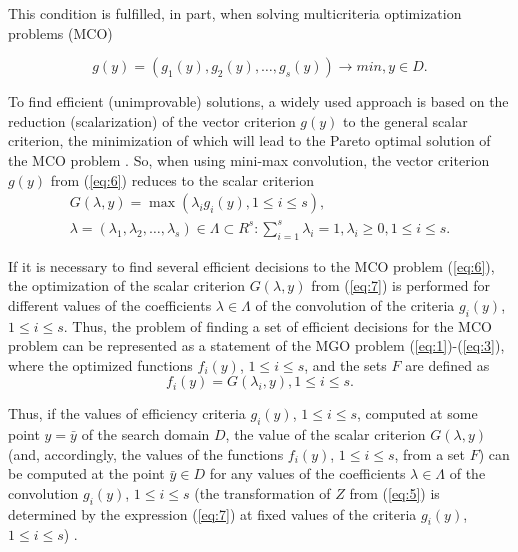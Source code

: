 \documentclass[review]{elsarticle}
\begin{document}
This condition is fulfilled, in part, when solving multicriteria optimization problems (MCO)

\begin{equation}\label{eq:6}
g(y) = (g_1(y), g_2(y), \dots , g_s(y)) \to min,  y\in D.
\end{equation}

To find efficient (unimprovable) solutions, a widely used approach is based on the reduction (scalarization) of the vector criterion $g(y)$ to the general scalar criterion, the minimization of which will lead to the Pareto optimal solution of the MCO problem \cite{c19,c20}. So, when using mini-max convolution, the vector criterion $g(y)$ from (\ref{eq:6}) reduces to the scalar criterion
\begin{equation}\label{eq:7}
\begin{matrix}
G(\lambda,y)=\max{(\lambda_i g_i(y),1 \leq i \leq s)},	\\
\lambda=(\lambda_1,\lambda_2,\dots,\lambda_s)\in \Lambda \subset R^s:\sum_{i=1}^s{\lambda_i =1},\lambda_i\geq 0,1 \leq i \leq s.
\end{matrix}
\end{equation}

If it is necessary to find several efficient decisions to the MCO problem (\ref{eq:6}), the optimization of the scalar criterion $G(\lambda,y)$ from (\ref{eq:7}) is performed for different values of the coefficients $\lambda \in \Lambda$ of the convolution of the criteria $g_i(y)$, $1 \leq i \leq s$. Thus, the problem of finding a set of efficient decisions for the MCO problem can be represented as a statement of the MGO problem (\ref{eq:1})-(\ref{eq:3}), where the optimized functions $f_i(y)$, $1 \leq i \leq s$, and the sets $F$ are defined as
\begin{equation}\label{eq:8}
f_i (y)= G(\lambda_i,y),1 \leq i \leq s.
\end{equation}

Thus, if the values of efficiency criteria $g_i(y)$, $1 \leq i \leq s$, computed at some point $y=\bar{y}$ of the search domain $D$, the value of the scalar criterion $G(\lambda,y)$ (and, accordingly, the values of the functions $f_i(y)$, $1 \leq i \leq s$, from a set $F$) can be computed at the point $\bar{y} \in D$ for any values of the coefficients $\lambda \in \Lambda$ of the convolution $g_i(y)$, $1 \leq i \leq s$ (the transformation of $Z$ from (\ref{eq:5}) is determined by the expression (\ref{eq:7}) at fixed values of the criteria $g_i(y)$, $1 \leq i \leq s$) \cite{c15,c16,c17}.
\end{document}
